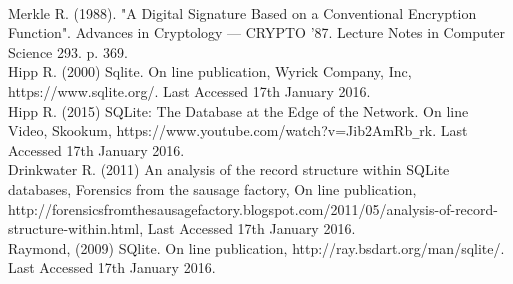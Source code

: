 \begin{thebibliography}{0}
\\
Merkle R. (1988). "A Digital Signature Based on a Conventional Encryption Function". Advances in Cryptology — CRYPTO '87. Lecture Notes in Computer Science 293. p. 369.
\\
Hipp R. (2000) Sqlite. On line publication, Wyrick Company, Inc, https://www.sqlite.org/. Last Accessed 17th January 2016.
\\
Hipp R. (2015) SQLite: The Database at the Edge of the Network. On line Video, Skookum, https://www.youtube.com/watch?v=Jib2AmRb\verb|_|rk. Last Accessed 17th January 2016.
\\
Drinkwater R. (2011) An analysis of the record structure within SQLite databases, Forensics from the sausage factory, On line publication, http://forensicsfromthesausagefactory.blogspot.com/2011/05/analysis-of-record- \newline structure-within.html, Last Accessed 17th January 2016.
\\
Raymond, (2009) SQlite.  On line publication, http://ray.bsdart.org/man/sqlite/. Last Accessed 17th January 2016.

\end{thebibliography}
